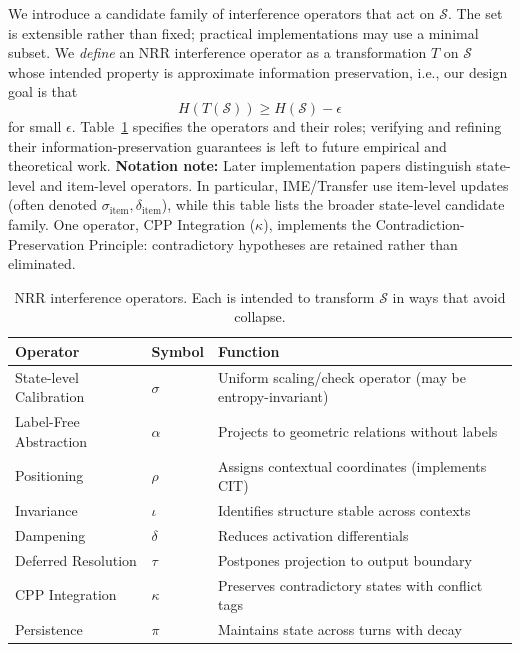 \documentclass[11pt,a4paper]{article}
\begin{document}
We introduce a candidate family of interference operators that act on $\mathcal{S}$.
The set is extensible rather than fixed; practical implementations may use a minimal subset.
We \emph{define} an NRR interference operator as a transformation $T$ on $\mathcal{S}$
whose intended property is approximate information preservation, i.e., our design goal is that
\begin{equation}
H(T(\mathcal{S})) \geq H(\mathcal{S}) - \epsilon
\end{equation}
for small $\epsilon$.
Table~\ref{tab:operators} specifies the operators and their roles; verifying and refining their information-preservation guarantees is left to future empirical and theoretical work.
\textbf{Notation note:} Later implementation papers distinguish state-level and item-level operators.
In particular, IME/Transfer use item-level updates (often denoted $\sigma_{\text{item}}, \delta_{\text{item}}$),
while this table lists the broader state-level candidate family.
One operator, CPP Integration ($\kappa$), implements the Contradiction-Preservation Principle: contradictory hypotheses are retained rather than eliminated.

\begin{table}[h]
\centering
\small
\begin{tabular}{lll}
\toprule
\textbf{Operator} & \textbf{Symbol} & \textbf{Function} \\
\midrule
State-level Calibration & $\sigma$ & Uniform scaling/check operator (may be entropy-invariant) \\
Label-Free Abstraction & $\alpha$ & Projects to geometric relations without labels \\
Positioning & $\rho$ & Assigns contextual coordinates (implements CIT) \\
Invariance & $\iota$ & Identifies structure stable across contexts \\
Dampening & $\delta$ & Reduces activation differentials \\
Deferred Resolution & $\tau$ & Postpones projection to output boundary \\
CPP Integration & $\kappa$ & Preserves contradictory states with conflict tags \\
Persistence & $\pi$ & Maintains state across turns with decay \\
\bottomrule
\end{tabular}
\caption{NRR interference operators. Each is intended to transform $\mathcal{S}$ in ways that avoid collapse.}
\label{tab:operators}
\end{table}
\end{document}
